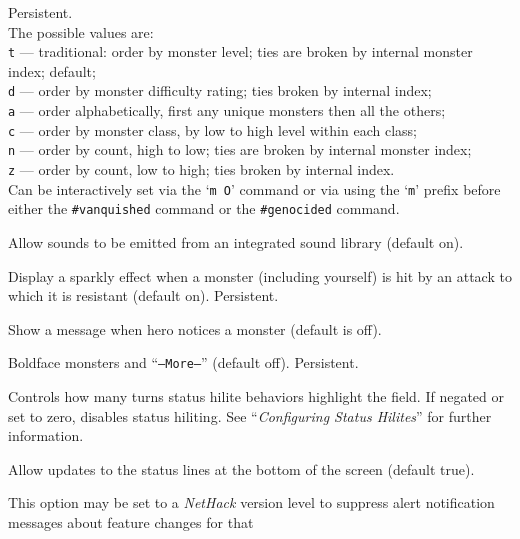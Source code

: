\documentclass[titlepage]{article}
\begin{document}
\begin{description}[font=\mdseries\itshape]
Persistent.
\\
The possible values are:
\\
\texttt{t} ---
traditional: order by monster level; ties are broken by internal
monster index;
default;
\\
\texttt{d} ---
order by monster difficulty rating; ties broken by internal index;
\\
\texttt{a} ---
order alphabetically, first any unique monsters then all the others;
\\
\texttt{c} ---
order by monster class, by low to high level within each class;
\\
\texttt{n} ---
order by count, high to low; ties are broken by internal monster index;
\\
\texttt{z} ---
order by count, low to high; ties broken by internal index.
\\
Can be interactively set via the `\texttt{m O}' command or via using
the `\texttt{m}' prefix before either the \texttt{\#vanquished} command
or the \texttt{\#genocided} command.
\item[sounds]
Allow sounds to be emitted from an integrated sound library (default on).
\item[sparkle]
Display a sparkly effect when a monster (including yourself) is hit by an
attack to which it is resistant (default on).  Persistent.
\item[spot\textunderscore monsters]
Show a message when hero notices a monster (default is off).
\item[standout]
Boldface monsters and ``\texttt{--More--}'' (default off).  Persistent.
\item[statushilites]
Controls how many turns status hilite behaviors highlight
the field. If negated or set to zero, disables status hiliting.
See ``\textit{Configuring Status Hilites}'' for further information.
\item[status\textunderscore updates]
Allow updates to the status lines at the bottom of the screen (default true).
\item[suppress\textunderscore alert]
This option may be set to a \textit{NetHack} version level to suppress
alert notification messages about feature changes for that

\end{description}
\end{document}
